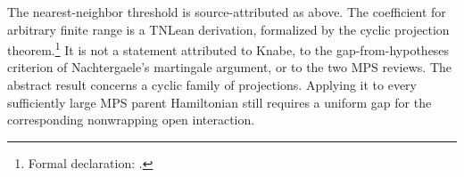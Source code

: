 \documentclass{article}
\begin{document}
The nearest-neighbor threshold is source-attributed as above. The coefficient
for arbitrary finite range is a TNLean derivation, formalized by the cyclic
projection theorem.\footnote{Formal declaration:
.}
It is not a statement attributed
to Knabe, to the gap-from-hypotheses criterion
\cite[Theorem~2.1(i)]{Nachtergaele1996Spectral} of Nachtergaele's martingale
argument, or to the two MPS reviews. The abstract result concerns a cyclic family of
projections. Applying it to every sufficiently large MPS parent Hamiltonian
still requires a uniform gap for the corresponding nonwrapping open
interaction.



\end{document}
